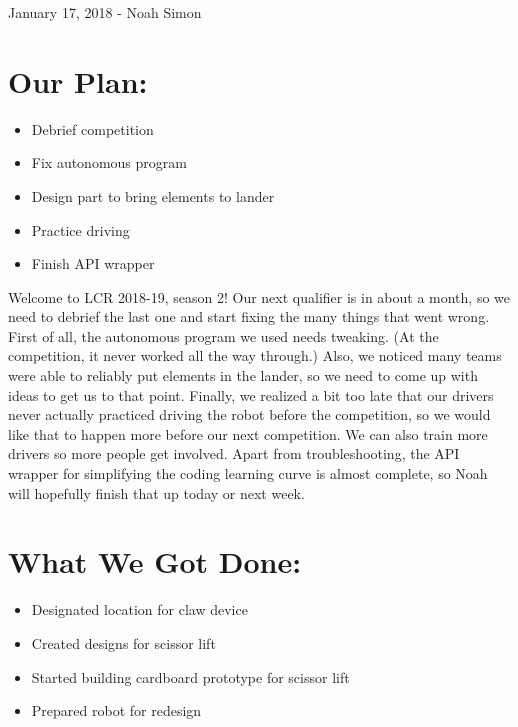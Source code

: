 \documentclass[12pt]{article}
\begin{document}
January 17, 2018 - Noah Simon

\section{Our Plan:} %
\begin{itemize}
	\item Debrief competition
	\item Fix autonomous program
	\item Design part to bring elements to lander
	\item Practice driving
	\item Finish API wrapper
\end{itemize}

Welcome to LCR 2018-19, season 2! Our next qualifier is in about a month, so we need to debrief the last one and start fixing the many things that went wrong. First of all, the autonomous program we used needs tweaking. (At the competition, it never worked all the way through.) Also, we noticed many teams were able to reliably put elements in the lander, so we need to come up with ideas to get us to that point. Finally, we realized a bit too late that our drivers never actually practiced driving the robot before the competition, so we would like that to happen more before our next competition. We can also train more drivers so more people get involved. Apart from troubleshooting, the API wrapper for simplifying the coding learning curve is almost complete, so Noah will hopefully finish that up today or next week.

\section{What We Got Done:} %
\begin{itemize}
	\item Designated location for claw device
	\item Created designs for scissor lift
	\item Started building cardboard prototype for scissor lift
	\item Prepared robot for redesign
\end{itemize}
\end{document}
